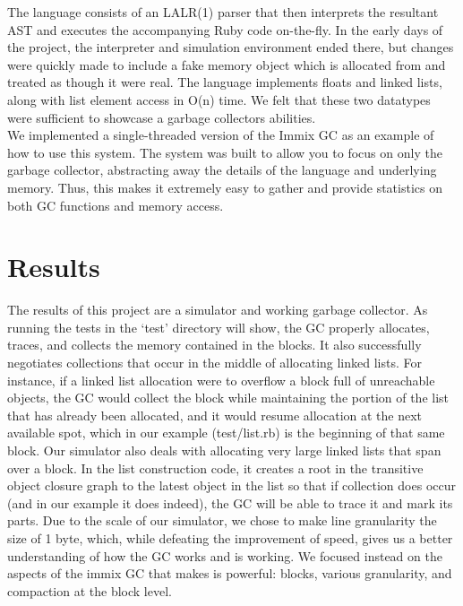 \documentclass{article}
\begin{document}
  The language consists of an LALR(1) parser that then interprets the resultant
  AST and executes the accompanying Ruby code on-the-fly. In the early days of
  the project, the interpreter and simulation environment ended there, but
  changes were quickly made to include a fake memory object which is allocated
  from and treated as though it were real. The language implements floats and
  linked lists, along with list element access in O(n) time. We felt that these
  two datatypes were sufficient to showcase a garbage collectors abilities. \\

  We implemented a single-threaded version of the Immix GC as an example of how
  to use this system. The system was built to allow you to focus on only the
  garbage collector, abstracting away the details of the language and underlying
  memory. Thus, this makes it extremely easy to gather and provide statistics on
  both GC functions and memory access.

  \section{Results}
  The results of this project are a simulator and working garbage collector. As
  running the tests in the ‘test’ directory will show, the GC properly
  allocates, traces, and collects the memory contained in the blocks. It also
  successfully negotiates collections that occur in the middle of allocating
  linked lists. For instance, if a linked list allocation were to overflow a
  block full of unreachable objects, the GC would collect the block while
  maintaining the portion of the list that has already been allocated, and it
  would resume allocation at the next available spot, which in our example
  (test/list.rb) is the beginning of that same block. Our simulator also deals
  with allocating very large linked lists that span over a block. In the list
  construction code, it creates a root in the transitive object closure graph to
  the latest object in the list so that if collection does occur (and in our
  example it does indeed), the GC will be able to trace it and mark its parts.
  Due to the scale of our simulator, we chose to make line granularity the size
  of 1 byte, which, while defeating the improvement of speed, gives us a better
  understanding of how the GC works and is working. We focused instead on the
  aspects of the immix GC that makes is powerful: blocks, various granularity,
  and compaction at the block level. \\
\end{document}
